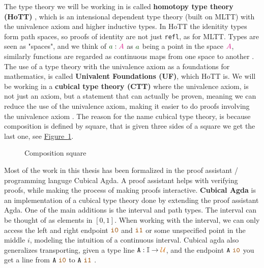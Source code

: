 \documentclass[twoside,11pt,openright]{report}
\theoremstyle{plain} %
\theoremstyle{definition}
\theoremstyle{remark}
\newcommand*{\figref}[1]{\hyperref[fig:#1]{Figure~\ref*{fig:#1}}}
\newcommand*{\term}[1]{\textcolor{green!30!black}{#1}} %
\newcommand*{\type}[1]{\textcolor{magenta!90!black}{#1}}
\newcommand*{\universe}[1]{\textcolor{orange!80!black}{#1}}
\newcommand*{\constant}[1]{\textcolor{orange!60!black}{\ensuremath{\mathtt{#1}}}}
\newcommand*{\typeformer}[1]{\ensuremath{\mathtt{#1}}}
\newcommand{\ct}{%
  \mathchoice{\mathbin{\raisebox{0.5ex}{$\displaystyle\centerdot$}}}%
             {\mathbin{\raisebox{0.5ex}{$\centerdot$}}}%
             {\mathbin{\raisebox{0.25ex}{$\scriptstyle\,\centerdot\,$}}}%
             {\mathbin{\raisebox{0.1ex}{$\scriptscriptstyle\,\centerdot\,$}}}
}
\begin{document}
The type theory we will be working in is called \textbf{homotopy type theory (HoTT)} \cite{hottbook}, which is an intensional dependent type theory (built on MLTT) with the univalence axiom and higher inductive types. In HoTT the idenitity types form path spaces, so proofs of identity are not just \texttt{refl}, as for MLTT. Types are seen as "spaces", and we think of \(\term{a} : \type{A}\) as \(\term{a}\) being a point in the space \(\type{A}\), similarly functions are regarded as continuous maps from one space to another \cite{nlab:homotopy_type_theory}. The use of a type theory with the univalence axiom as a foundations for mathematics, is called \textbf{Univalent Foundations (UF)}, which HoTT is. We will be working in a \textbf{cubical type theory (CTT)} \cite{DBLP:CTT} where the univalence axiom, is not just an axiom, but a statement that can actually be proven, meaning we can reduce the use of the univalence axiom, making it easier to do proofs involving the univalence axiom \cite{nlab:cubical_type_theory}.  The reason for the name cubical type theory, is because composition is defined by square, that is given three sides of a square we get the last one, see \figref{cubical-composition-square}.
\begin{figure}[h]
  \centering
  \caption{Composition square}
  \label{fig:cubical-composition-square}
\end{figure}
Most of the work in this thesis has been formalized in the proof assistant / programming languge Cubical Agda. A proof assistant helps with verifying proofs, while making the process of making proofs interactive. \textbf{Cubical Agda} is an implementation of a cubical type theory done by extending the proof assistant Agda. One of the main additions is the interval and path types. The interval can be thought of as elements in \([0,1]\). When working with the interval, we can only access the left and right endpoint \(\constant{i0}\) and \(\constant{i1}\) or some unspecified point in the middle \(i\), modeling the intuition of a continuous interval. Cubical agda also generalizes transporting, given a type line \(\typeformer{A} : \mathbb{I} \rightarrow \universe{\mathcal{U}}\), and the endpoint \(\typeformer{A}~\constant{i0}\) you get a line from \(\typeformer{A}~\constant{i0}\) to \(\typeformer{A}~\constant{i1}\) \cite{cubicalagda}.  
\end{document}
